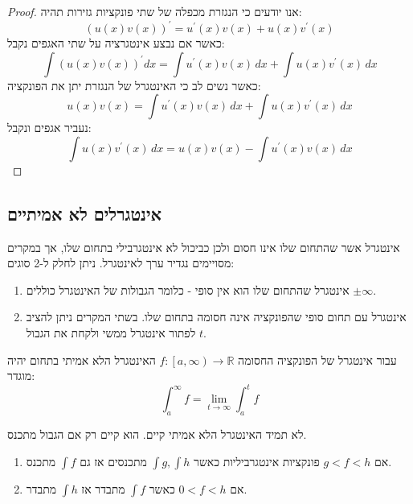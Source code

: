 \documentclass{tstextbook}
\begin{document}
\begin{proof}
אנו יודעים כי הנגזרת מכפלה של שתי פונקציות גזירות תהיה:
$$\left(u(x)v(x)\right)^{\prime}=u^{\prime}(x)v(x)+u(x)v^{\prime}(x)$$
כאשר אם נבצע אינטגרציה על שתי האגפים נקבל:
$$\int\left(u(x)v(x)\right)^{\prime}d x=\int u^{\prime}(x)v(x)\,d x+\int u(x)v^{\prime}(x)\,d x$$
כאשר נשים לב כי האינטגרל של הנגזרת יתן את הפונקציה:
$$u(x)v(x)=\int u^{\prime}(x)v(x)\,d x+\int u(x)v^{\prime}(x)\,d x$$
נעביר אגפים ונקבל:
$$\int u(x)v^{\prime}(x)\,d x=u(x)v(x)-\int u^{\prime}(x)v(x)\,d x$$

\end{proof}
\subsection{אינטגרלים לא אמיתיים}

\begin{definition}
אינטגרל אשר שהתחום שלו אינו חסום ולכן כביכול לא אינטגרבילי בתחום שלו, אך במקרים מסויימים נגדיר ערך לאינטגרל. ניתן לחלק ל-2 סוגים:

\end{definition}
\begin{enumerate}
  \item אינטגרל שהתחום שלו הוא אין סופי - כלומר הגבולות של האינטגרל כוללים \(\pm \infty\). 


  \item אינטגרל עם תחום סופי שהפונקציה אינה חסומה בתחום שלו. 
בשתי המקרים ניתן להציב \(t\) לפתור אינטגרל ממשי ולקחת את הגבול.


\end{enumerate}
\begin{example}
עבור אינטגרל של הפונקציה החסומה \(f:\left[ a,\infty \right)\to \mathbb{R}\) האינטגרל הלא אמיתי בתחום יהיה מוגדר:
$$\int_a^\infty f = \lim_{t\rightarrow \infty} \int_a^t f$$

\end{example}
\begin{remark}
לא תמיד האינטגרל הלא אמיתי קיים. הוא קיים רק אם הגבול מתכנס.

\end{remark}
\begin{proposition}
  \begin{enumerate}
    \item אם \(g<f<h\) פונקציות אינטגרביליות כאשר \(\int g, \int h\) מתכנסים אז גם \(\int f\) מתכנס. 


    \item אם \(0<f<h\) כאשר \(\int f\) מתבדר אז \(\int h\) מתבדר. 


  \end{enumerate}
\end{proposition}
\end{document}

